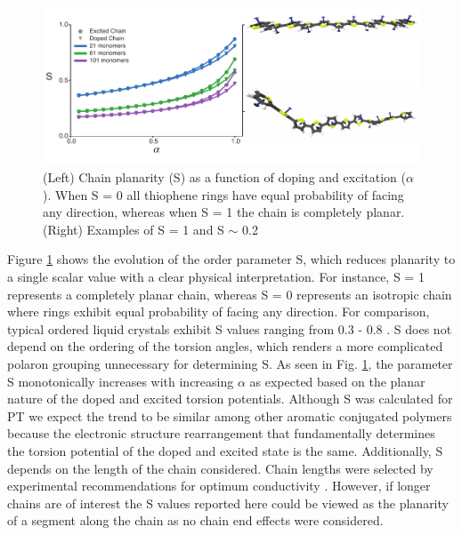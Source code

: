 \begin{figure}
    \centering
    \includegraphics{figures/chap2/S.pdf}
    \caption[Doped and Excited Chain Planarity]{(Left) Chain planarity (S) as a function of doping and excitation ($\alpha$). When S = 0 all thiophene rings have equal probability of facing any direction, whereas when S = 1 the chain is completely planar. (Right) Examples of S = 1 and S $\sim$ 0.2}
    \label{fig:s_order}
\end{figure}

Figure \ref{fig:s_order} shows the evolution of the order parameter S, which reduces planarity to a single scalar value with a clear physical interpretation. For instance, S = 1 represents a completely planar chain, whereas S = 0 represents an isotropic chain where rings exhibit equal probability of facing any direction. For comparison, typical ordered liquid crystals exhibit S values ranging from 0.3 - 0.8 \cite{Colfen2008}. S does not depend on the ordering of the torsion angles, which renders a more complicated polaron grouping unnecessary for determining S. As seen in Fig. \ref{fig:s_order}, the parameter S monotonically increases with increasing $\alpha$ as expected based on the planar nature of the doped and excited torsion potentials. Although S was calculated for PT we expect the trend to be similar among other aromatic conjugated polymers because the electronic structure rearrangement that fundamentally determines the torsion potential of the doped and excited state is the same. Additionally, S depends on the length of the chain considered. Chain lengths were selected by experimental recommendations for optimum conductivity \cite{Noriega2013}. However, if longer chains are of interest the S values reported here could be viewed as the planarity of a segment along the chain as no chain end effects were considered.

